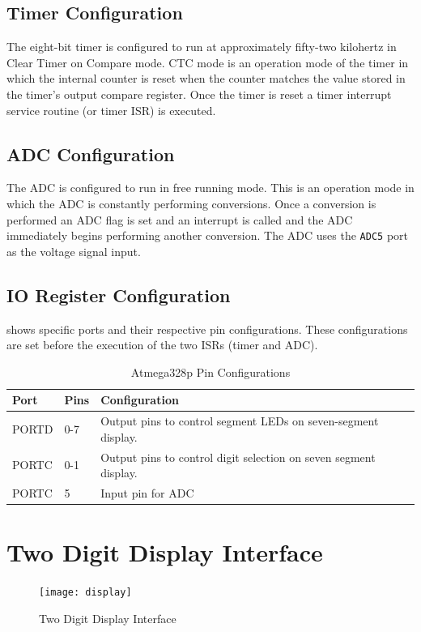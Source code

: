 \documentclass[main.tex]{subfiles}
\begin{document}
		\subsection{Timer Configuration}
		The eight-bit timer is configured to run at approximately fifty-two
		kilohertz in Clear Timer on Compare mode. CTC mode is an operation mode of
		the timer in which the internal counter is reset when the counter matches
		the value stored in the timer's output compare register. Once the timer is
		reset a timer interrupt service routine (or timer ISR) is executed.

		\subsection{ADC Configuration}
		The ADC is configured to run in free running mode. This is an operation mode
		in which the ADC is constantly performing conversions. Once a conversion is
		performed an ADC flag is set and an interrupt is called and the ADC
		immediately begins performing another conversion. The ADC uses the
		\lstinline{ADC5} port as the voltage signal input. 

		\subsection{IO Register Configuration}
		 shows specific ports and their respective pin
		configurations. These configurations are set before the execution of the two
		ISRs (timer and ADC).

		\begin{table}[H]
			\begin{center}
				\begin{tabularx}{\textwidth}{llX} 
					\toprule 
					Port & Pins & Configuration \\ \midrule 
					PORTD & 0-7 & Output pins to control segment LEDs on seven-segment display. \\  \midrule
					PORTC & 0-1 & Output pins to control digit selection on seven segment display. \\ \midrule
					PORTC & 5 & Input pin for ADC \\
					\bottomrule
				\end{tabularx}
				\caption{Atmega328p Pin Configurations}
				\label{tab:pinConfig}
			\end{center}
		\end{table}
	
	\section{Two Digit Display Interface}
		\begin{figure}[H]
			\begin{center}
				\texttt{[image: display]}
			\end{center}
			\caption{Two Digit Display Interface}
			\label{fig:twoDigitIfc}
		\end{figure}
\end{document}
